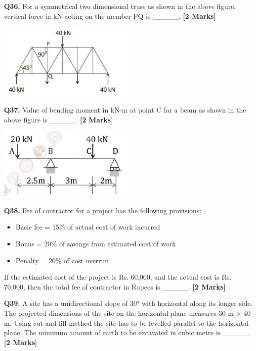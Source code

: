 \documentclass[11pt]{article}
\newcommand{\questionb}[2]{
    \noindent\textbf{Q#2.} #1 \hfill \textbf{[2 Marks]}
}
\begin{document}
\vspace{0.5cm}

\questionb{For a symmetrical two dimensional truss as shown in the above figure, vertical force in kN acting on the member PQ is \_\_\_\_\_.}{36}

\begin{center}
\includegraphics[width=0.5\textwidth]{figures/36.png}
\end{center}

\vspace{0.5cm}

\questionb{Value of bending moment in kN-m at point C for a beam as shown in the above figure is \_\_\_\_\_.}{37}

\begin{center}
\includegraphics[width=0.5\textwidth]{figures/37.png}
\end{center}

\vspace{0.5cm}

\questionb{Fee of contractor for a project has the following provisions:
\begin{itemize}
    \item Basic fee = 15\% of actual cost of work incurred
    \item Bonus = 20\% of savings from estimated cost of work
    \item Penalty = 20\% of cost overrun
\end{itemize}
If the estimated cost of the project is Rs. 60,000, and the actual cost is Rs. 70,000, then the total fee of contractor in Rupees is \_\_\_\_\_.}{38}

\vspace{0.5cm}

\questionb{A site has a unidirectional slope of 30° with horizontal along its longer side. The projected dimensions of the site on the horizontal plane measures 30 m × 40 m. Using cut and fill method the site has to be levelled parallel to the horizontal plane. The minimum amount of earth to be excavated in cubic metre is \_\_\_\_\_.}{39}
\end{document}
